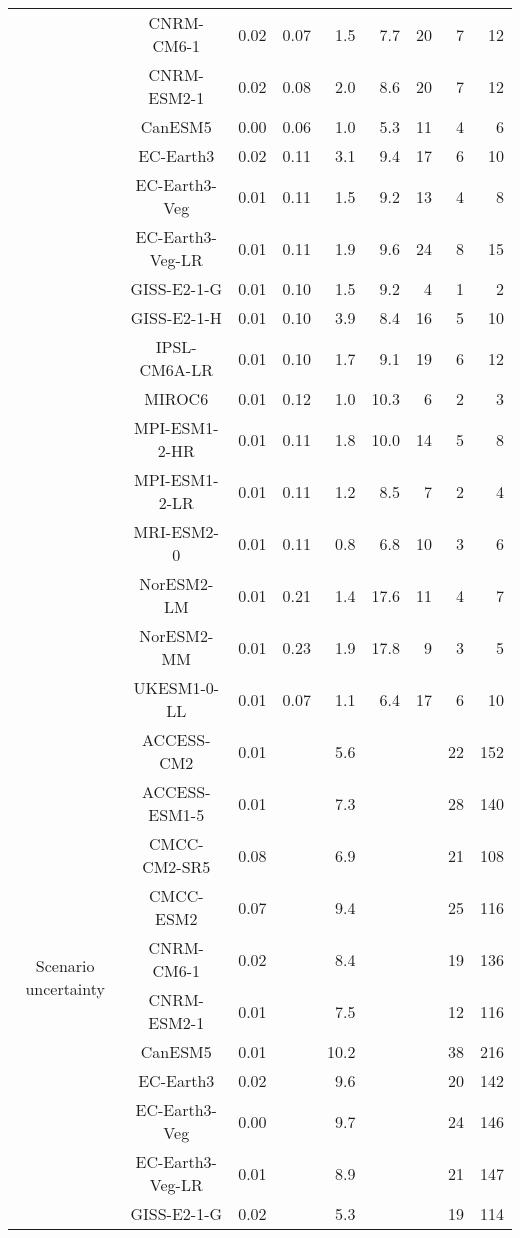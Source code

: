 \begin{table*}[t]
\begin{tabular}{c|c|rr|rr|rrr}
 & CNRM-CM6-1 & 0.02 & 0.07 & 1.5 & 7.7 & 20 & 7 & 12 \\
 & CNRM-ESM2-1 & 0.02 & 0.08 & 2.0 & 8.6 & 20 & 7 & 12 \\
 & CanESM5 & 0.00 & 0.06 & 1.0 & 5.3 & 11 & 4 & 6 \\
 & EC-Earth3 & 0.02 & 0.11 & 3.1 & 9.4 & 17 & 6 & 10 \\
 & EC-Earth3-Veg & 0.01 & 0.11 & 1.5 & 9.2 & 13 & 4 & 8 \\
 & EC-Earth3-Veg-LR & 0.01 & 0.11 & 1.9 & 9.6 & 24 & 8 & 15 \\
 & GISS-E2-1-G & 0.01 & 0.10 & 1.5 & 9.2 & 4 & 1 & 2 \\
 & GISS-E2-1-H & 0.01 & 0.10 & 3.9 & 8.4 & 16 & 5 & 10 \\
 & IPSL-CM6A-LR & 0.01 & 0.10 & 1.7 & 9.1 & 19 & 6 & 12 \\
 & MIROC6 & 0.01 & 0.12 & 1.0 & 10.3 & 6 & 2 & 3 \\
 & MPI-ESM1-2-HR & 0.01 & 0.11 & 1.8 & 10.0 & 14 & 5 & 8 \\
 & MPI-ESM1-2-LR & 0.01 & 0.11 & 1.2 & 8.5 & 7 & 2 & 4 \\
 & MRI-ESM2-0 & 0.01 & 0.11 & 0.8 & 6.8 & 10 & 3 & 6 \\
 & NorESM2-LM & 0.01 & 0.21 & 1.4 & 17.6 & 11 & 4 & 7 \\
 & NorESM2-MM & 0.01 & 0.23 & 1.9 & 17.8 & 9 & 3 & 5 \\
 & UKESM1-0-LL & 0.01 & 0.07 & 1.1 & 6.4 & 17 & 6 & 10 \\
\cline{1-9}
\multirow[c]{20}{*}{Scenario uncertainty} & ACCESS-CM2 & 0.01 &  & 5.6 &  &  & 22 & 152 \\
 & ACCESS-ESM1-5 & 0.01 &  & 7.3 &  &  & 28 & 140 \\
 & CMCC-CM2-SR5 & 0.08 &  & 6.9 &  &  & 21 & 108 \\
 & CMCC-ESM2 & 0.07 &  & 9.4 &  &  & 25 & 116 \\
 & CNRM-CM6-1 & 0.02 &  & 8.4 &  &  & 19 & 136 \\
 & CNRM-ESM2-1 & 0.01 &  & 7.5 &  &  & 12 & 116 \\
 & CanESM5 & 0.01 &  & 10.2 &  &  & 38 & 216 \\
 & EC-Earth3 & 0.02 &  & 9.6 &  &  & 20 & 142 \\
 & EC-Earth3-Veg & 0.00 &  & 9.7 &  &  & 24 & 146 \\
 & EC-Earth3-Veg-LR & 0.01 &  & 8.9 &  &  & 21 & 147 \\
 & GISS-E2-1-G & 0.02 &  & 5.3 &  &  & 19 & 114 \\

\end{tabular}
\end{table*}
